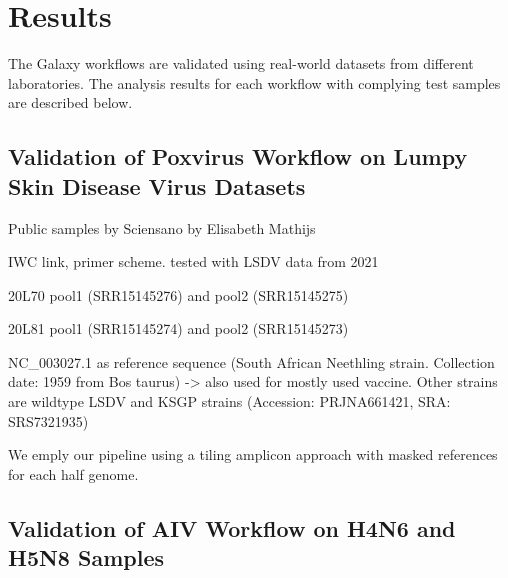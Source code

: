\chapter{Results}\label{chap:results}
The Galaxy workflows are validated using real-world datasets from different laboratories. The analysis results for each workflow with complying test samples are described below.

\section{Validation of Poxvirus Workflow on Lumpy Skin Disease Virus Datasets}
\todoit
Public samples by Sciensano by Elisabeth Mathijs

\ac{IWC} link, primer scheme.
tested with \ac{LSDV} data from 2021

20L70 pool1 (SRR15145276) %
and pool2 (SRR15145275) %

20L81 pool1 (SRR15145274) %
and pool2 (SRR15145273) %

NC\_003027.1 as reference sequence (South African Neethling strain. Collection date: 1959 from Bos taurus)
-> also used for mostly used vaccine. Other strains are wildtype LSDV and KSGP strains (Accession: PRJNA661421, SRA: SRS7321935)

We emply our pipeline using a tiling amplicon approach with masked references for each half genome.


\section{Validation of AIV Workflow on H4N6 and H5N8 Samples}\label{sec:4-aiv}
\todoit

